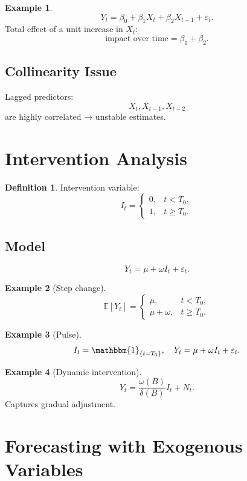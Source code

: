 \documentclass[12pt,oneside]{book}
\numberwithin{equation}{section}
\theoremstyle{definition}
\newtheorem{definition}{Definition}[section]
\newtheorem{example}{Example}[section]
\theoremstyle{plain}
\theoremstyle{remark}
\newcommand{\E}{\mathbb{E}}
\newcommand{\ind}{\mathbbm{1}}
\begin{document}
\begin{example}
\[
Y_t = \beta_0 + \beta_1 X_t + \beta_2 X_{t-1} + \varepsilon_t.
\]
Total effect of a unit increase in $X_t$:
\[
\text{impact over time} = \beta_1 + \beta_2.
\]
\end{example}

\subsection{Collinearity Issue}

Lagged predictors:
\[
X_t, X_{t-1}, X_{t-2}
\]
are highly correlated → unstable estimates.

\section{Intervention Analysis}

\begin{definition}
Intervention variable:
\[
I_t =
\begin{cases}
0, & t < T_0,\\
1, & t \ge T_0.
\end{cases}
\]
\end{definition}

\subsection{Model}

\[
Y_t = \mu + \omega I_t + \varepsilon_t.
\]

\begin{example}[Step change]
\[
\E[Y_t] =
\begin{cases}
\mu, & t<T_0,\\
\mu+\omega, & t\ge T_0.
\end{cases}
\]
\end{example}

\begin{example}[Pulse]
\[
I_t = \ind_{\{t=T_0\}},
\quad
Y_t = \mu + \omega I_t + \varepsilon_t.
\]
\end{example}

\begin{example}[Dynamic intervention]
\[
Y_t = \frac{\omega(B)}{\delta(B)} I_t + N_t.
\]
Captures gradual adjustment.
\end{example}

\section{Forecasting with Exogenous Variables}
\end{document}
